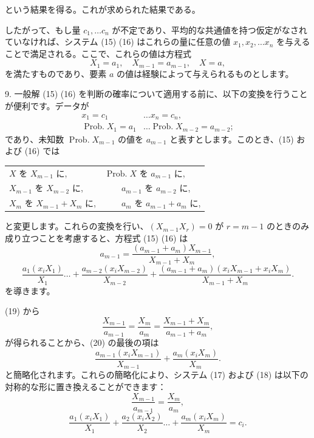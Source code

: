 \documentclass[a4paper,11pt,openany]{ltjsbook}
\begin{document}
という結果を得る。これが求められた結果である。

したがって、もし量 $c_1,\dotsc c_n$ が不定であり、平均的な共通値を持つ仮定がなされていなければ、システム (15) (16) はこれらの量に任意の値 $x_1, x_2, \dotsc x_n$ を与えることで満足される。ここで、これらの値は方程式
\begin{equation*}
X_1 = a_1, \quad X_{m-1} = a_{m-1}, \quad X=a,
\end{equation*}
を満たすものであり、要素 $a$ の値は経験によって与えられるものとします。

9. 一般解 (15) (16) を判断の確率について適用する前に、以下の変換を行うことが便利です。データが
\begin{align*}
x_1 = c_1 & \dots x_n=c_n, \\
\operatorname{Prob. } X_1 = a_1 & \dots
\operatorname{Prob. } X_{m-2} = a_{m-2};
\end{align*}
であり、未知数 $\operatorname{Prob. } X_{m-1}$ の値を $a_{m-1}$ と表すとします。このとき、(15) および (16) では \\
\begin{center}
\begin{tabular}{ll}
$X$ を $X_{m-1}$ に, & $\operatorname{Prob. } X$ を $a_{m-1}$ に, \\
$X_{m-1}$ を $X_{m-2}$ に, & $\quad \quad a_{m-1}$ を $a_{m-2}$ に, \\
$X_m$ を $X_{m-1} + X_m$ に, & $\quad \quad a_m$ を $a_{m-1} + a_m$ に,
\end{tabular}\end{center}
と変更します。これらの変換を行い、$(X_{m-1} X_r)=0$ が $r = m-1$ のときのみ成り立つことを考慮すると、方程式 (15) (16) は
\begin{equation}\tag{19}
a_{m-1}=\frac{(a_{m-1} + a_m)X_{m-1}}{X_{m-1}+X_m},
\end{equation}
\begin{equation}\tag{20}
  \frac{a_1(x_i X_1)}{X_1} \dotsc
+ \frac{a_{m-2}(x_i X_{m-2})}{X_{m-2}}
+ \frac{(a_{m-1} + a_m)(x_i X_{m-1} + x_i X_m)}{X_{m-1} + X_m}.
\end{equation}
を導きます。

(19) から
\begin{equation*}
\frac{X_{m-1}}{a_{m-1}}=\frac{X_m}{a_m} = \frac{X_{m-1}+X_m}{a_{m-1}+a_m},
\end{equation*}
が得られることから、(20) の最後の項は
\begin{equation*}
\frac{a_{m-1}(x_i X_{m-1})}{X_{m-1}}+\frac{a_m(x_i X_m)}{X_m}.
\end{equation*}
と簡略化されます。これらの簡略化により、システム (17) および (18) は以下の対称的な形に置き換えることができます：
\begin{equation}\tag{21}
\frac{X_{m-1}}{a_{m-1}}=\frac{X_m}{a_m},
\end{equation}
\begin{equation}\tag{22}
\frac{a_1(x_i X_1)}{X_1} +
\frac{a_2(x_i X_2)}{X_2}\dotsc +
\frac{a_m(x_i X_m)}{X_m} = c_i.
\end{equation}
\end{document}
